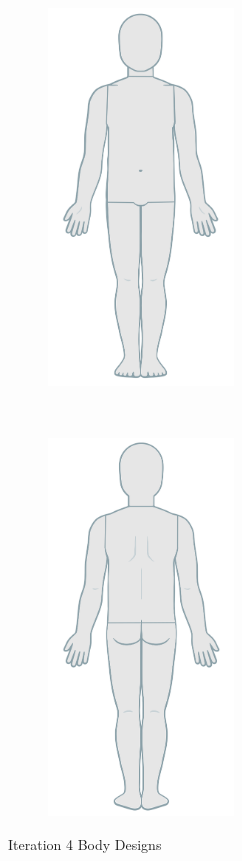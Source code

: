 \begin{figure}[t!]
    \centering
    \begin{subfigure}[t]{0.5\textwidth}
        \centering
        \includegraphics[height=10cm]{figures/bodydesign4front.png}
    \end{subfigure}%
    ~
    \begin{subfigure}[t]{0.5\textwidth}
        \centering
        \includegraphics[height=10cm]{figures/bodydesign4back.png}
    \end{subfigure}
    \caption{Iteration 4 Body Designs}
    \label{fig:it4design}
\end{figure}

